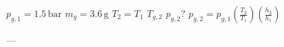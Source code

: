 \( p_{g,1} = 1.5 \, \text{bar} \)  
\( m_g = 3.6 \, \text{g} \)  
\( T_2 = T_1 \)  
\( T_{g,2} \)  
\( p_{g,2} \)?  
\( p_{g,2} = p_{g,1} \left( \frac{T_2}{T_1} \right) \left( \frac{h_2}{h_1} \right) \)  

---